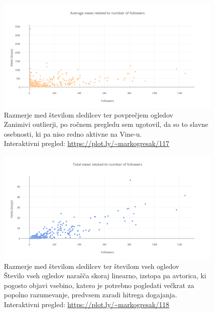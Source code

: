 \documentclass[a4paper,11pt]{article}
\begin{document}
\begin{figure}[htbp]
  \begin{center}
    \includegraphics[width=\textwidth,height=\textheight,keepaspectratio]{figures/follower-avg-views.png}
    \caption{Razmerje med številom sledilcev ter povprečjem ogledov\\
    Zanimivi outlierji, po ročnem pregledu sem ugotovil, da so to slavne osebnosti, ki pa niso redno aktivne na Vine-u. \\
    Interaktivni pregled: \href{https://plot.ly/~markogresak/117}{\underline{https://plot.ly/{\sim}markogresak/117}}}
  \end{center}
\end{figure}

\begin{figure}[htbp]
  \begin{center}
    \includegraphics[width=\textwidth,height=\textheight,keepaspectratio]{figures/follower-total-views.png}
    \caption{Razmerje med številom sledilcev ter številom vseh ogledov\\
    Število vseh ogledov narašča skoraj linearno, izstopa pa avtorica, ki pogosto objavi vsebino, katero je potrebno pogledati večkrat za popolno razumevanje, predvsem zaradi hitrega dogajanja. \\
    Interaktivni pregled: \href{https://plot.ly/~markogresak/118}{\underline{https://plot.ly/{\sim}markogresak/118}}}
  \end{center}
\end{figure}
\end{document}

